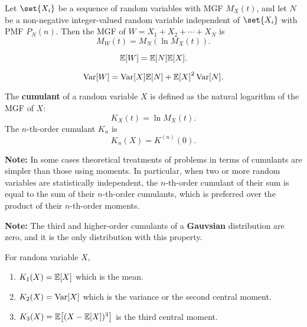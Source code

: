 \begin{theorem}
    Let $\set{X_i}$ be a sequence of \iid random variables with \textnormal{MGF} $M_X(t)$, and let $N$ be a non-negative integer-valued random variable independent of $\set{X_i}$ with \textnormal{PMF} $P_N(n)$. Then the \textnormal{MGF} of $W=X_1+X_2+\cdots+X_N$ is
    \[M_W(t)=M_N(\ln M_X(t)).\]
\end{theorem}

\begin{theorem}
    \[\E{W}=\E{N}\E{X}.\]
\end{theorem}

\begin{theorem}
    \[\Var[W]=\Var[X]\E{N}+\E{X}^2\Var[N].\]
\end{theorem}

\begin{definition}
    The \textbf{cumulant} of a random variable $X$ is defined as the natural logarithm of the \textnormal{MGF} of $X$:
    \[K_X(t)=\ln M_X(t).\]
    The $n$-th-order cumulant $K_n$ is
    \[K_n(X)=K^{(n)}(0).\]
\end{definition}

\textbf{Note:} In some cases theoretical treatments of problems in terms of cumulants are simpler than those using moments. In particular, when two or more random variables are statistically independent, the $n$-th-order cumulant of their sum is equal to the sum of their $n$-th-order cumulants, which is preferred over the product of their $n$-th-order moments.

\textbf{Note:} The third and higher-order cumulants of a \textbf{Gauvsian} distribution are zero, and it is the only distribution with this property.

\begin{theorem}
    For random variable $X$,
    \begin{enumerate}
        \item $K_1(X)=\E{X}$ which is the mean.
        \item $K_2(X)=\mathop{\mathrm{Var}}\nolimits[X]$ which is the variance or the second central moment.
        \item $K_3(X)=\E{(X-\E{X})^3}$ is the third central moment.
    \end{enumerate}
\end{theorem}

